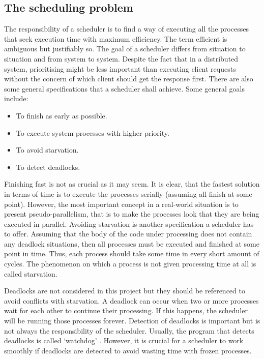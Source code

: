 	\subsection{The scheduling problem}	
\label{schedulers}
The responsibility of a scheduler is to find a way of executing all the processes that seek execution time with maximum efficiency. The term efficient is ambiguous but justifiably so. The goal of a scheduler differs from situation to situation and from system to system. Despite the fact that in a distributed system, prioritising might be less important than executing client requests without the concern of which client should get the response first. There are also some general specifications that a scheduler shall achieve.
Some general goals include:
\begin{itemize}
\item To finish as early as possible.
\item To execute system processes with higher priority.
\item To avoid starvation.
\item To detect deadlocks.
\end{itemize}
Finishing fast is not as crucial as it may seem. It is clear, that the fastest solution in terms of time is to execute the processes serially (assuming all finish at some point). However, the most important concept in a real-world situation is to present pseudo-parallelism, that is to make the processes look that they are being executed in parallel. 
Avoiding starvation is another specification a scheduler has to offer. Assuming that the body of the code under processing does not contain any deadlock situations, then all processes must be executed and finished at some point in time. Thus, each process should take some time in every short amount of cycles. The phenomenon on which a process is not given processing time at all is called starvation. 

Deadlocks are not considered in this project but they should be referenced to avoid conflicts with starvation. A deadlock can occur when two or more processes wait for each other to continue their processing. If this happens, the scheduler will be running those processes forever. Detection of deadlocks is important but is not always the responsibility of the scheduler. Usually, the program that detects deadlocks is called `watchdog' \cite{tanenbaum_modern_2007}. However, it is crucial for a scheduler to work smoothly if deadlocks are detected to avoid wasting time with frozen processes.

